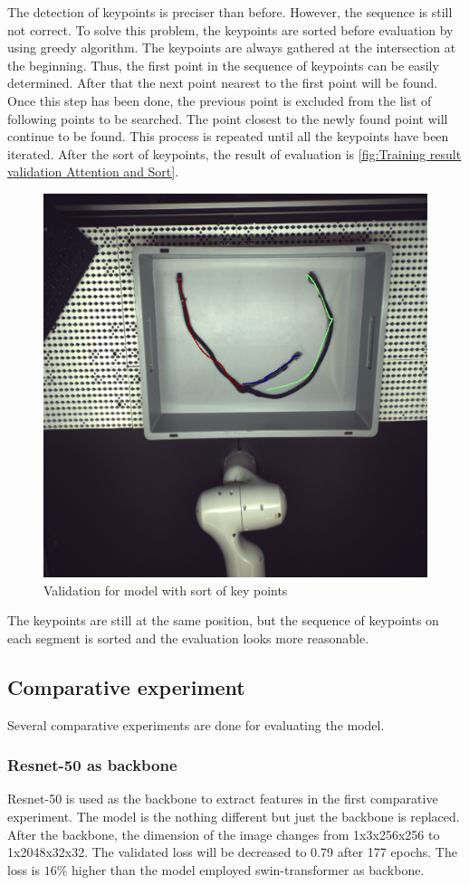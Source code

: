 The detection of keypoints is preciser than before. However, the sequence is still not correct.
To solve this problem, the keypoints are sorted before evaluation by using greedy algorithm. The keypoints are always gathered 
at the intersection at the beginning. Thus, the first point in the sequence of keypoints can be easily determined. After that the 
next point nearest to the first point will be found. Once this step has been done, the previous point is excluded from the list of 
following points to be searched. The point closest to the newly found point will continue to be found. This process is repeated 
until all the keypoints have been iterated. After the sort of keypoints, the result of evaluation is \autoref{fig:Training result validation Attention and Sort}.\\
\begin{figure}
	\centering
	\includegraphics[width=0.6\linewidth]{example_images/withAttn_sort_keypoints_100_eval}
	\caption{Validation for model with sort of key points}
	\label{fig:Training result validation Attention and Sort}
\end{figure}
The keypoints are still at the same position, but the sequence of keypoints on each segment is sorted and the evaluation looks more reasonable. 
\subsection{Comparative experiment}
Several comparative experiments are done for evaluating the model.\\ 
\subsubsection{Resnet-50 as backbone}
Resnet-50 is used as the backbone to extract features in the first comparative experiment. The model is the nothing different but just the backbone is 
replaced. After the backbone, the dimension of the image changes from 1x3x256x256 to 1x2048x32x32. The validated loss will be decreased to 0.79 after 
177 epochs. The loss is $16\%$ higher than the model employed swin-transformer as backbone.  

